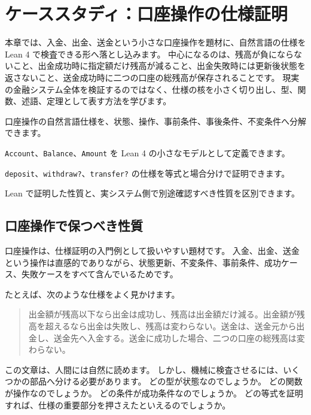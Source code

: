 \chapter{ケーススタディ：口座操作の仕様証明}
\label{chap:account-spec-proof}

\begin{chapterabstract}
本章では、入金、出金、送金という小さな口座操作を題材に、自然言語の仕様を Lean 4 で検査できる形へ落とし込みます。
中心になるのは、残高が負にならないこと、出金成功時に指定額だけ残高が減ること、出金失敗時には更新後状態を返さないこと、送金成功時に二つの口座の総残高が保存されることです。
現実の金融システム全体を検証するのではなく、仕様の核を小さく切り出し、型、関数、述語、定理として表す方法を学びます。
\end{chapterabstract}

\begin{learninggoals}
\item 口座操作の自然言語仕様を、状態、操作、事前条件、事後条件、不変条件へ分解できます。
\item \texttt{Account}、\texttt{Balance}、\texttt{Amount} を Lean 4 の小さなモデルとして定義できます。
\item \texttt{deposit}、\texttt{withdraw?}、\texttt{transfer?} の仕様を等式と場合分けで証明できます。
\item Lean で証明した性質と、実システム側で別途確認すべき性質を区別できます。
\end{learninggoals}

\section{口座操作で保つべき性質}

口座操作は、仕様証明の入門例として扱いやすい題材です。
入金、出金、送金という操作は直感的でありながら、状態更新、不変条件、事前条件、成功ケース、失敗ケースをすべて含んでいるためです。

たとえば、次のような仕様をよく見かけます。

\begin{quote}
出金額が残高以下なら出金は成功し、残高は出金額だけ減る。出金額が残高を超えるなら出金は失敗し、残高は変わらない。送金は、送金元から出金し、送金先へ入金する。送金に成功した場合、二つの口座の総残高は変わらない。
\end{quote}

この文章は、人間には自然に読めます。
しかし、機械に検査させるには、いくつかの部品へ分ける必要があります。
どの型が状態なのでしょうか。
どの関数が操作なのでしょうか。
どの条件が成功条件なのでしょうか。
どの等式を証明すれば、仕様の重要部分を押さえたといえるのでしょうか。

